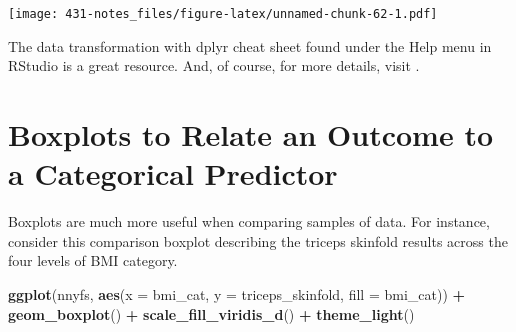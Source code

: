 \documentclass[
]{book}
\newenvironment{Shaded}{\begin{snugshade}}{\end{snugshade}}
\newcommand{\DataTypeTok}[1]{\textcolor[rgb]{0.13,0.29,0.53}{#1}}
\newcommand{\FloatTok}[1]{\textcolor[rgb]{0.00,0.00,0.81}{#1}}
\newcommand{\KeywordTok}[1]{\textcolor[rgb]{0.13,0.29,0.53}{\textbf{#1}}}
\newcommand{\NormalTok}[1]{#1}
\newcommand{\OperatorTok}[1]{\textcolor[rgb]{0.81,0.36,0.00}{\textbf{#1}}}
\newcommand{\OtherTok}[1]{\textcolor[rgb]{0.56,0.35,0.01}{#1}}
\newcommand{\StringTok}[1]{\textcolor[rgb]{0.31,0.60,0.02}{#1}}
\begin{document}
\begin{Shaded}
\end{Shaded}

\texttt{[image: 431-notes\_files/figure-latex/unnamed-chunk-62-1.pdf]}

The data transformation with dplyr cheat sheet found under the Help menu in RStudio is a great resource. And, of course, for more details, visit \citet{R4DS}.

\hypertarget{boxplots-to-relate-an-outcome-to-a-categorical-predictor}{%
\section{Boxplots to Relate an Outcome to a Categorical Predictor}\label{boxplots-to-relate-an-outcome-to-a-categorical-predictor}}

Boxplots are much more useful when comparing samples of data. For instance, consider this comparison boxplot describing the triceps skinfold results across the four levels of BMI category.

\begin{Shaded}
\begin{Highlighting}[]
\KeywordTok{ggplot}\NormalTok{(nnyfs, }\KeywordTok{aes}\NormalTok{(}\DataTypeTok{x =}\NormalTok{ bmi_cat, }\DataTypeTok{y =}\NormalTok{ triceps_skinfold,}
                  \DataTypeTok{fill =}\NormalTok{ bmi_cat)) }\OperatorTok{+}
\StringTok{    }\KeywordTok{geom_boxplot}\NormalTok{() }\OperatorTok{+}
\StringTok{    }\KeywordTok{scale_fill_viridis_d}\NormalTok{() }\OperatorTok{+}
\StringTok{    }\KeywordTok{theme_light}\NormalTok{()}
\end{Highlighting}
\end{Shaded}
\end{document}
